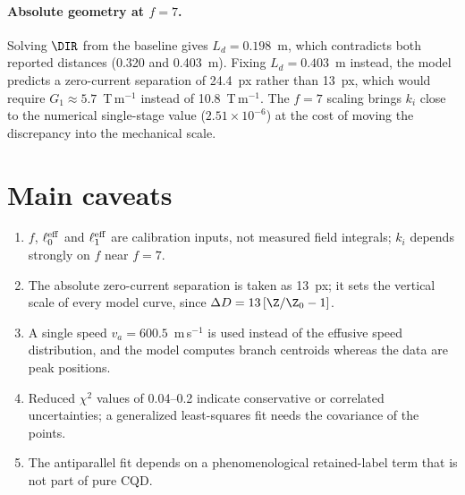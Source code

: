 \paragraph{Absolute geometry at $f=7$.} Solving $\DIR$ from the baseline gives $L_d=0.198$~m, which
contradicts both reported distances (0.320 and 0.403~m). Fixing $L_d=0.403$~m instead, the model
predicts a zero-current separation of 24.4~px rather than 13~px, which would require
$G_1\approx5.7$~T\,m$^{-1}$ instead of 10.8~T\,m$^{-1}$. The $f=7$ scaling brings $k_i$ close to the
numerical single-stage value ($2.51\times10^{-6}$) at the cost of moving the discrepancy into the
mechanical scale.

\section{Main caveats}
\begin{enumerate}
\item $f$, $\ell_0^{\rm eff}$ and $\ell_1^{\rm eff}$ are calibration inputs, not measured field integrals;
$k_i$ depends strongly on $f$ near $f=7$.
\item The absolute zero-current separation is taken as 13~px; it sets the vertical scale of every model
curve, since $\Delta D=13\,[\Z/\Z_0-1]$.
\item A single speed $v_a=600.5$~m\,s$^{-1}$ is used instead of the effusive speed distribution, and the
model computes branch centroids whereas the data are peak positions.
\item Reduced $\chi^2$ values of 0.04--0.2 indicate conservative or correlated uncertainties; a
generalized least-squares fit needs the covariance of the points.
\item The antiparallel fit depends on a phenomenological retained-label term that is not part of pure
CQD.
\end{enumerate}

\appendix
